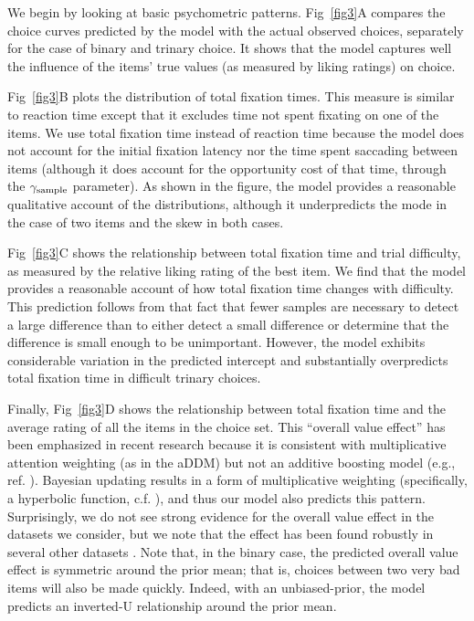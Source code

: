  
We begin by looking at basic psychometric patterns. Fig~\ref{fig3}A compares the choice curves predicted by the model with the actual observed choices, separately for the case of binary and trinary choice. It shows that the model captures well the influence of the items' true values (as measured by liking ratings) on choice. 

Fig~\ref{fig3}B plots the distribution of total fixation times. This measure is similar to reaction time except that it excludes time not spent fixating on one of the items. We use total fixation time instead of reaction time because the model does not account for the initial fixation latency nor the time spent saccading between items (although it does account for the opportunity cost of that time, through the $\gamma_\text{sample}$ parameter). As shown in the figure, the model provides a reasonable qualitative account of the distributions, although it underpredicts the mode in the case of two items and the skew in both cases.

Fig~\ref{fig3}C shows the relationship between total fixation time and trial difficulty, as measured by the relative liking rating of the best item. We find that the model provides a reasonable account of how total fixation time changes with difficulty. This prediction follows from that fact that fewer samples are necessary to detect a large difference than to either detect a small difference or determine that the difference is small enough to be unimportant. However, the model exhibits considerable variation in the predicted intercept and substantially overpredicts total fixation time in difficult trinary choices.

Finally, Fig~\ref{fig3}D shows the relationship between total fixation time and the average rating of all the items in the choice set. This ``overall value effect'' has been emphasized in recent research \citep{smith2019gaze,krajbich2018accounting} because it is consistent with multiplicative attention weighting (as in the aDDM) but not an additive boosting model (e.g., ref. \citealp{cavanagh2014eye}). Bayesian updating results in a form of multiplicative weighting (specifically, a hyperbolic function, c.f. \citealp{armel2008neuroeconomic}), and thus our model also predicts this pattern. Surprisingly, we do not see strong evidence for the overall value effect in the datasets we consider, but we note that the effect has been found robustly in several other datasets \citep{smith2019gaze,fromer2019goal,hunt2012mechanisms,polania2014neural,pirrone2018evidence}. Note that, in the binary case, the predicted overall value effect is symmetric around the prior mean; that is, choices between two very bad items will also be made quickly. Indeed, with an unbiased-prior, the model predicts an inverted-U relationship around the prior mean. 


